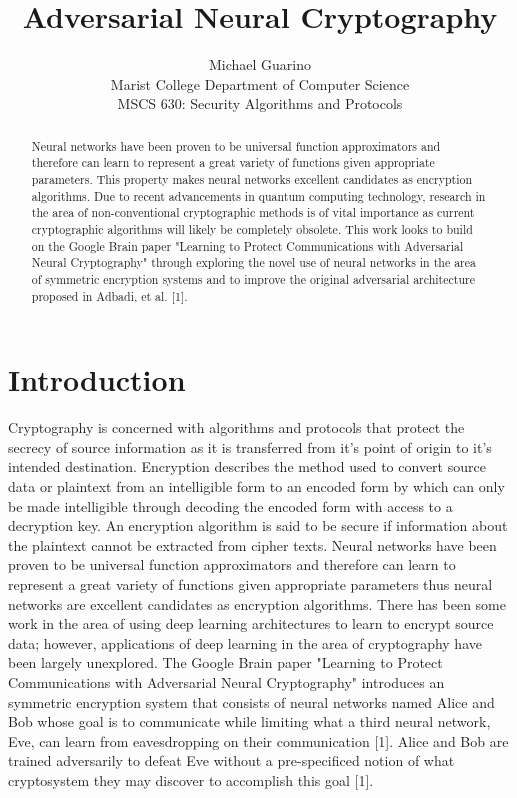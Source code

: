 \documentclass[12pt]{article}
\begin{document}
\title{Adversarial Neural Cryptography}
\author{Michael Guarino\\
        Marist College Department of Computer Science\\
        MSCS 630: Security Algorithms and Protocols}
\maketitle
\begin{abstract}
Neural networks have been proven to be universal function approximators and therefore can learn to represent a great variety of functions given appropriate parameters. This property makes neural networks excellent candidates as encryption algorithms. Due to recent advancements in quantum computing technology, research in the area of non-conventional cryptographic methods is of vital importance as current cryptographic algorithms will likely be completely obsolete. This work looks to build on the Google Brain paper "Learning to Protect Communications with Adversarial Neural Cryptography" through exploring the novel use of neural networks in the area of symmetric encryption systems and to improve the original adversarial architecture proposed in Adbadi, et al. [1].
\end{abstract}

\section{Introduction}

Cryptography is concerned with algorithms and protocols that protect the secrecy of source information as it is transferred from it's point of origin to it's intended destination. Encryption describes the method used to convert source data or plaintext from an intelligible form to an encoded form by which can only be made intelligible through decoding the encoded form with access to a decryption key. An encryption algorithm is said to be secure if information about the plaintext cannot be extracted from cipher texts.
Neural networks have been proven to be universal function approximators and therefore can learn to represent a great variety of functions given appropriate parameters thus neural networks are excellent candidates as encryption algorithms. There has been some work in the area of using deep learning architectures to learn to encrypt source data; however, applications of deep learning in the area of cryptography have been largely unexplored.
The Google Brain paper "Learning to Protect Communications with Adversarial Neural Cryptography" introduces an symmetric encryption system that consists of neural networks named Alice and Bob whose goal is to communicate while limiting what a third neural network, Eve, can learn from eavesdropping on their communication [1]. Alice and Bob are trained adversarily to defeat Eve without a pre-specificed notion of what cryptosystem they may discover to accomplish this goal [1].
\end{document}
